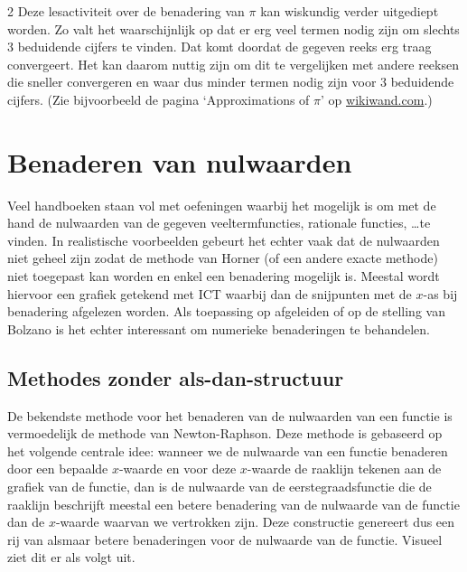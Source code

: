         \begin{multicols}{2}
        Deze lesactiviteit over de benadering van $\pi$ kan wiskundig verder uitgediept worden. Zo valt het waarschijnlijk op dat er erg veel termen nodig zijn om slechts 3 beduidende cijfers te vinden. Dat komt doordat de gegeven reeks erg traag convergeert. Het kan daarom nuttig zijn om dit te vergelijken met andere reeksen die sneller convergeren en waar dus minder termen nodig zijn voor 3 beduidende cijfers. (Zie bijvoorbeeld de pagina `Approximations of $\pi$' op \url{wikiwand.com}.)
        
	

	\section{Benaderen van nulwaarden}
        Veel handboeken staan vol met oefeningen waarbij het mogelijk is om met de hand de nulwaarden van de gegeven veeltermfuncties, rationale functies, \ldots te vinden. In realistische voorbeelden gebeurt het echter vaak dat de nulwaarden niet geheel zijn zodat de methode van Horner (of een andere exacte methode) niet toegepast kan worden en enkel een benadering mogelijk is. Meestal wordt hiervoor een grafiek getekend met ICT waarbij dan de snijpunten met de $x$-as bij benadering afgelezen worden. Als toepassing op afgeleiden of op de stelling van Bolzano is het echter interessant om numerieke benaderingen te behandelen.
        
        \subsection{Methodes zonder als-dan-structuur}
        De bekendste methode voor het benaderen van de nulwaarden van een functie is vermoedelijk de methode van Newton-Raphson. Deze methode is gebaseerd op het volgende centrale idee: wanneer we de nulwaarde van een functie benaderen door een bepaalde $x$-waarde en voor deze $x$-waarde de raaklijn tekenen aan de grafiek van de functie, dan is de nulwaarde van de eerstegraadsfunctie die de raaklijn beschrijft meestal een betere benadering van de nulwaarde van de functie dan de $x$-waarde waarvan we vertrokken zijn. Deze constructie genereert dus een rij van alsmaar betere benaderingen voor de nulwaarde van de functie. Visueel ziet dit er als volgt uit.


\end{multicols}
